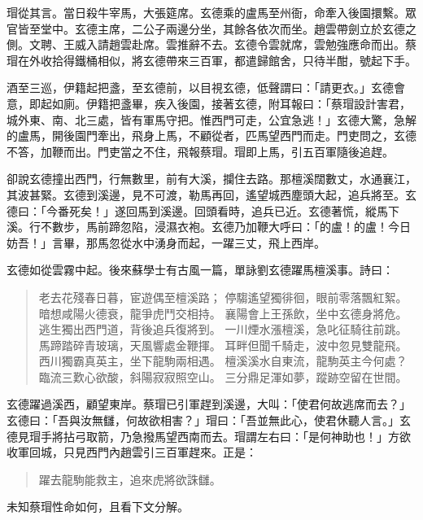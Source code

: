 瑁從其言。當日殺牛宰馬，大張筵席。玄德乘的盧馬至州衙，命牽入後園擐繫。眾官皆至堂中。玄德主席，二公子兩邊分坐，其餘各依次而坐。趙雲帶劍立於玄德之側。文聘、王威入請趙雲赴席。雲推辭不去。玄德令雲就席，雲勉強應命而出。蔡瑁在外收拾得鐵桶相似，將玄德帶來三百軍，都遣歸館舍，只待半酣，號起下手。

酒至三巡，伊籍起把盞，至玄德前，以目視玄德，低聲謂曰：「請更衣。」玄德會意，即起如廁。伊籍把盞畢，疾入後園，接著玄德，附耳報曰：「蔡瑁設計害君，城外東、南、北三處，皆有軍馬守把。惟西門可走，公宜急逃！」玄德大驚，急解的盧馬，開後園門牽出，飛身上馬，不顧從者，匹馬望西門而走。門吏問之，玄德不答，加鞭而出。門吏當之不住，飛報蔡瑁。瑁即上馬，引五百軍隨後追趕。

卻說玄德撞出西門，行無數里，前有大溪，攔住去路。那檀溪闊數丈，水通襄江，其波甚緊。玄德到溪邊，見不可渡，勒馬再回，遙望城西塵頭大起，追兵將至。玄德曰：「今番死矣！」遂回馬到溪邊。回頭看時，追兵已近。玄德著慌，縱馬下溪。行不數步，馬前蹄忽陷，浸濕衣袍。玄德乃加鞭大呼曰：「的盧！的盧！今日妨吾！」言畢，那馬忽從水中湧身而起，一躍三丈，飛上西岸。

玄德如從雲霧中起。後來蘇學士有古風一篇，單詠劉玄德躍馬檀溪事。詩曰：

\begin{quote}
老去花殘春日暮，宦遊偶至檀溪路；
停騶遙望獨徘徊，眼前零落飄紅絮。
暗想咸陽火德衰，龍爭虎鬥交相持。
襄陽會上王孫飲，坐中玄德身將危。
逃生獨出西門道，背後追兵復將到。
一川煙水漲檀溪，急叱征騎往前跳。
馬蹄踏碎青玻璃，天風響處金鞭揮。
耳畔但聞千騎走，波中忽見雙龍飛。
西川獨霸真英主，坐下龍駒兩相遇。
檀溪溪水自東流，龍駒英主今何處？
臨流三歎心欲酸，斜陽寂寂照空山。
三分鼎足渾如夢，蹤跡空留在世間。
\end{quote}

玄德躍過溪西，顧望東岸。蔡瑁已引軍趕到溪邊，大叫：「使君何故逃席而去？」玄德曰：「吾與汝無讎，何故欲相害？」瑁曰：「吾並無此心，使君休聽人言。」玄德見瑁手將拈弓取箭，乃急撥馬望西南而去。瑁謂左右曰：「是何神助也！」方欲收軍回城，只見西門內趙雲引三百軍趕來。正是：

\begin{quote}
躍去龍駒能救主，追來虎將欲誅讎。
\end{quote}

未知蔡瑁性命如何，且看下文分解。

